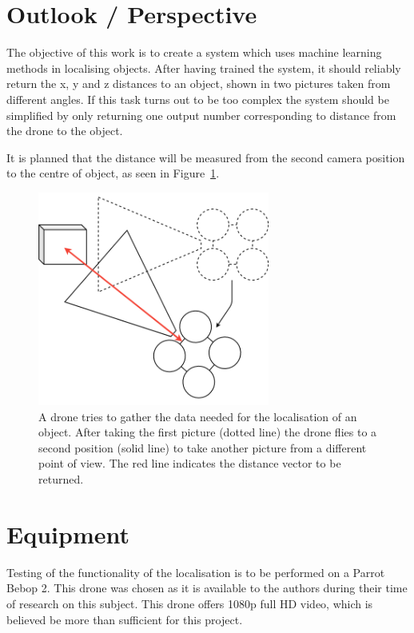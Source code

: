 \section{Outlook / Perspective}
The objective of this work is to create a system which uses machine learning methods in localising objects. After having trained the system, it should reliably return the x, y and z distances to an object, shown in two pictures taken from different angles. If this task turns out to be too complex the system should be simplified by only returning one output number corresponding to distance from the drone to the object.

It is planned that the distance will be measured from the second camera position to the centre of object, as seen in Figure~\ref{pic:introduction_outlookPerspective_pointsOfView}.

\begin{figure}[h]
	\centering
	\includegraphics[width=3in]{img/introduction_outlookPerspective_pointsOfView.png}
	\caption{A drone tries to gather the data needed for the localisation of an object. After taking the first picture (dotted line) the drone flies to a second position (solid line) to take another picture from a different point of view. The red line indicates the distance vector to be returned.}
	\label{pic:introduction_outlookPerspective_pointsOfView}
\end{figure}

\section{Equipment}
Testing of the functionality of the localisation is to be performed on a Parrot Bebop 2. This drone was chosen as it is available to the authors during their time of research on this subject. This drone offers 1080p full HD video, which is believed be more than sufficient for this project.


